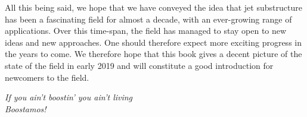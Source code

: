 
All this being said, we hope that we have conveyed the idea that jet
substructure has been a fascinating field for almost a decade, with an
ever-growing range of applications. Over this time-span, the field has
managed to stay open to new ideas and new approaches. One should
therefore expect more exciting progress in the years to come.
%
We therefore hope that this book gives a decent picture of the state
of the field in early 2019 and will constitute a good introduction
for newcomers to the field.

\vspace{0.5cm}

\begin{center}
\emph{If you ain't boostin' you ain't living}\\
\emph{\textexclamdown Boostamos!}~\cite{boostamos}
\end{center}



